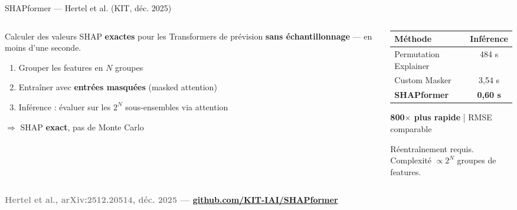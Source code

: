 \documentclass[10pt]{beamer}
\newcommand{\source}[1]{\vspace{6pt}\hfill{\textcolor{gray}{\textbf{\tiny #1}}}}
\begin{document}
\begin{frame}{SHAPformer --- Hertel et al. (KIT, déc. 2025)}
  \begin{columns}
    \begin{column}{0.518\textwidth}
      \begin{tcolorbox}[
        colback=blue!3, colframe=blue!40!black,
        arc=2mm, boxrule=0.5pt, fonttitle=\bfseries,
        title={Problème résolu}]
        Calculer des valeurs SHAP \textbf{exactes} pour les Transformers de prévision
        \textbf{sans échantillonnage} --- en moins d'une seconde.
      \end{tcolorbox}
      \begin{tcolorbox}[
        colback=orange!3, colframe=orange!50!black,
        arc=2mm, boxrule=0.5pt, fonttitle=\bfseries,
        title={Mécanisme}]
        \begin{enumerate}
          \item Grouper les features en $N$ groupes
          \item Entraîner avec \textbf{entrées masquées} (masked attention)
          \item Inférence : évaluer sur les $2^N$ sous-ensembles via attention
        \end{enumerate}
        $\Rightarrow$ SHAP \textbf{exact}, pas de Monte Carlo
      \end{tcolorbox}
    \end{column}
    \begin{column}{0.48\textwidth}
      \begin{tcolorbox}[
        colback=green!3, colframe=green!40!black,
        arc=2mm, boxrule=0.5pt, fonttitle=\bfseries,
        title={Résultats (TransnetBW, Table 1)}]
        \hspace{-0.5cm}
        \begin{tabular}{lc}
          \toprule
          \textbf{Méthode} & \textbf{Inférence} \\
          \midrule
          Permutation Explainer & 484 s \\
          Custom Masker & 3,54 s \\
          \textbf{SHAPformer} & \textbf{0,60 s} \\
          \bottomrule
        \end{tabular}
        \vspace{4pt}
        \textbf{800$\times$ plus rapide} | RMSE comparable
      \end{tcolorbox}
      \begin{tcolorbox}[
        colback=red!3, colframe=red!60!black,
        arc=2mm, boxrule=0.5pt, fonttitle=\bfseries,
        title={Limite}]
        Réentraînement requis.\\
        Complexité $\propto 2^N$ groupes de features.
      \end{tcolorbox}
    \end{column}
  \end{columns}
  \source{Hertel et al., arXiv:2512.20514, déc. 2025 --- \href{https://github.com/KIT-IAI/SHAPformer}{github.com/KIT-IAI/SHAPformer}}
\end{frame}
\end{document}
